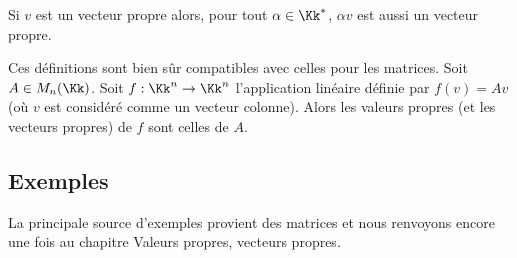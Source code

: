 \documentclass[12pt, class=report,crop=false]{standalone}
\begin{document}
Si $v$ est un vecteur propre alors, pour tout $\alpha \in \Kk^*$, $\alpha v$ est aussi un vecteur propre.
 

 
Ces définitions sont bien sûr compatibles avec celles pour les matrices.
Soit $A \in M_n(\Kk)$. Soit $f : \Kk^n \to \Kk^n$ l'application linéaire définie par  
$f(v) = Av$ (où $v$ est considéré comme un vecteur colonne). Alors les valeurs propres (et les vecteurs propres) de $f$ sont celles de $A$.
 
 

\subsection{Exemples}


La principale source d'exemples provient des matrices et nous renvoyons encore une fois au chapitre \og{}Valeurs propres, vecteurs propres\fg{}.
\end{document}
